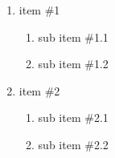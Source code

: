 \documentclass[a4paper,12pt]{article}
\begin{document}
\begin{enumerate}
	\item {item \#1}
	\begin{enumerate}
		\item {sub item \#1.1}
		\item {sub item \#1.2}
	\end{enumerate}

	\item {item \#2}
	\begin{enumerate}
		\item {sub item \#2.1}
		\item {sub item \#2.2}
	\end{enumerate}
\end{enumerate}
\end{document}
